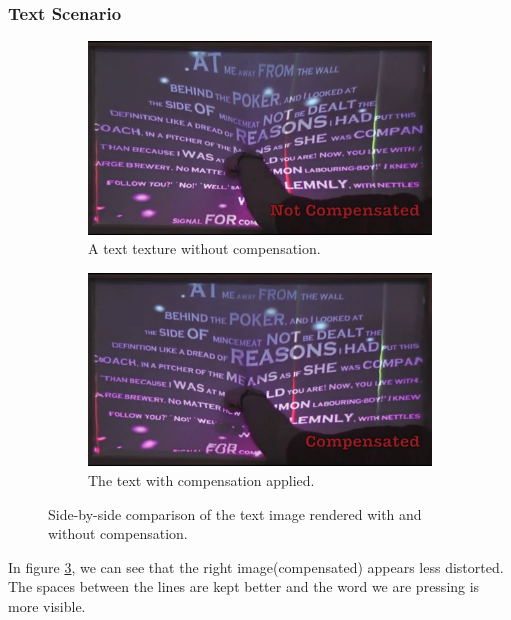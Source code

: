 \documentclass[]{article}
\begin{document}
\subsubsection{Text Scenario}

\begin{figure}[!h]
\centering
\begin{subfigure}{.5\textwidth}
  \centering
  \includegraphics[width=0.9\linewidth]{figures/compensation/TextNotCompensated.png}
  \caption{A text texture without compensation.}
  \label{fig:TextNotCompensated}
\end{subfigure}%
\begin{subfigure}{.5\textwidth}
  \centering
  \includegraphics[width=0.9\linewidth]{figures/compensation/TextCompensated.png}
  \caption{The text with compensation applied.}
  \label{fig:TextCompensated}
\end{subfigure}
\caption{Side-by-side comparison of the text image rendered with and without compensation.}
\label{fig:TextComparison}
\end{figure}

In figure \ref{fig:TextComparison}, we can see that the right image(compensated) appears less distorted. The spaces between the lines are kept better and the word we are pressing is more visible.
\end{document}
